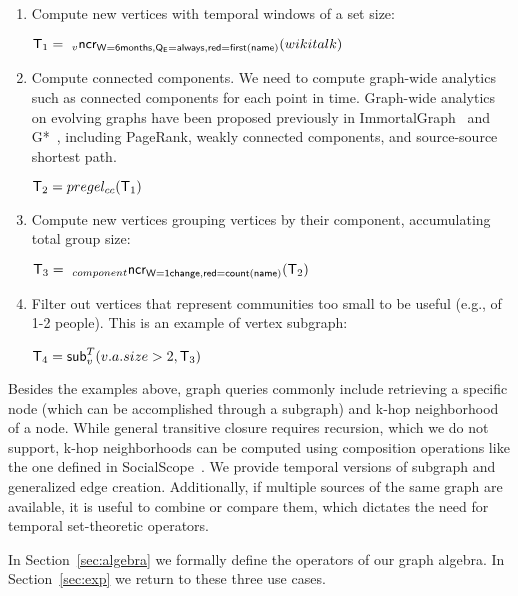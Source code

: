 \begin{enumerate}[noitemsep,itemindent=\dimexpr\labelwidth+\labelsep\relax,leftmargin=0pt]
\item Compute new vertices with temporal windows of a set size:

\begin{center}
\vspace{-0.2cm}
$\mathsf{T}_1 = ~_{v}\textsf{ncr}_{\mathsf{W=6 months,Q_E=always,red=first(name)}}(wikitalk)$
\vspace{-0.2cm}
\end{center}

\item Compute connected components.  We need to compute graph-wide
  analytics such as connected components for each point in time.
  Graph-wide analytics on evolving graphs have been proposed
  previously in ImmortalGraph~\cite{Miao2015} and
  G*~\cite{Labouseur2015}, including PageRank, weakly connected
  components, and source-source shortest path.

\begin{center}
\vspace{-0.2cm}
$\mathsf{T}_2 = pregel_{cc} (\mathsf{T}_1)$
\vspace{-0.2cm}
\end{center}

\item Compute new vertices grouping vertices by their component,
  accumulating total group size:

\begin{center}
\vspace{-0.2cm}
$\mathsf{T}_3 = ~_{component}\textsf{ncr}_{\mathsf{W=1 change,red=count(name)}}(\mathsf{T}_2)$
\vspace{-0.2cm}
\end{center}

\item Filter out vertices that represent communities too small to be
  useful (e.g., of 1-2 people).  This is an example of vertex subgraph:

\begin{center}
\vspace{-0.2cm}
$\mathsf{T}_4 = \textsf{sub}^T_v(v.a.size > 2,\mathsf{T}_3)$
\vspace{-0.2cm}
\end{center}

\end{enumerate}

Besides the examples above, graph queries commonly include retrieving
a specific node (which can be accomplished through a subgraph) and
k-hop neighborhood of a node.  While general transitive closure
requires recursion, which we do not support, k-hop neighborhoods can
be computed using composition operations like the one defined in
SocialScope~\cite{Amer-Yahia2009}.  We provide temporal versions of
subgraph and generalized edge creation.  Additionally, if multiple
sources of the same graph are available, it is useful to combine or
compare them, which dictates the need for temporal set-theoretic
operators.

In Section~\ref{sec:algebra} we formally define the operators of our
graph algebra.  In Section~\ref{sec:exp} we return to these three use
cases.  
